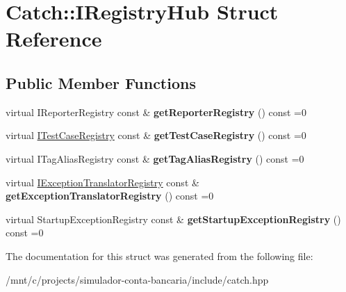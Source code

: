 \hypertarget{structCatch_1_1IRegistryHub}{}\section{Catch\+:\+:I\+Registry\+Hub Struct Reference}
\label{structCatch_1_1IRegistryHub}
\subsection*{Public Member Functions}
\begin{DoxyCompactItemize}
\item 
\mbox{\label{structCatch_1_1IRegistryHub_a55534563f7ecf7e20ec1e37285ebe54d}} 
virtual I\+Reporter\+Registry const  \& {\bfseries get\+Reporter\+Registry} () const =0
\item 
\mbox{\label{structCatch_1_1IRegistryHub_af4f6255f0c0f8f1f179fa9d7d4843076}} 
virtual \hyperlink{structCatch_1_1ITestCaseRegistry}{I\+Test\+Case\+Registry} const  \& {\bfseries get\+Test\+Case\+Registry} () const =0
\item 
\mbox{\label{structCatch_1_1IRegistryHub_a3c511b1d33e5a6d95c333a0ff387df1a}} 
virtual I\+Tag\+Alias\+Registry const  \& {\bfseries get\+Tag\+Alias\+Registry} () const =0
\item 
\mbox{\label{structCatch_1_1IRegistryHub_a48347c170d9c583af73027a27b2f0bd4}} 
virtual \hyperlink{structCatch_1_1IExceptionTranslatorRegistry}{I\+Exception\+Translator\+Registry} const  \& {\bfseries get\+Exception\+Translator\+Registry} () const =0
\item 
\mbox{\label{structCatch_1_1IRegistryHub_a00281210628e6c616aca1d3e0d84db04}} 
virtual Startup\+Exception\+Registry const  \& {\bfseries get\+Startup\+Exception\+Registry} () const =0
\end{DoxyCompactItemize}


The documentation for this struct was generated from the following file\+:\begin{DoxyCompactItemize}
\item 
/mnt/c/projects/simulador-\/conta-\/bancaria/include/catch.\+hpp\end{DoxyCompactItemize}
